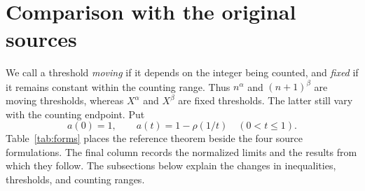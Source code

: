 \documentclass[11pt,a4paper]{amsart}
\begin{document}
\section{Comparison with the original sources}\label{sec:sources}

We call a threshold \emph{moving} if it depends on the integer being
counted, and \emph{fixed} if it remains constant within the counting
range. Thus $n^\alpha$ and $(n+1)^\beta$ are moving thresholds, whereas
$X^\alpha$ and $X^\beta$ are fixed thresholds. The latter still vary
with the counting endpoint. Put
\[
 a(0)=1,\qquad a(t)=1-\rho(1/t)\quad(0<t\le1).
\]
Table~\ref{tab:forms} places the reference theorem beside the four
source formulations. The final column records the normalized limits
and the results from which they follow. The subsections below explain
the changes in inequalities, thresholds, and counting ranges.
\end{document}
